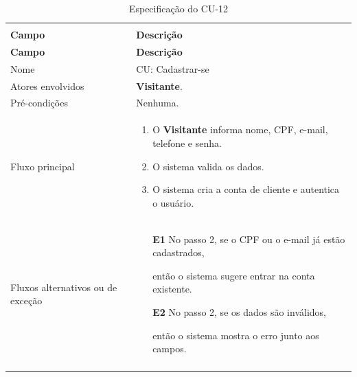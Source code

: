 \documentclass[12pt,a4paper]{article}
\begin{document}
{\setlength{\arrayrulewidth}{0.3pt}\renewcommand{\arraystretch}{1.1}\small{}
\begin{xltabular}{\textwidth}{>{\raggedright\arraybackslash}p{3.4cm}|>{\raggedright\arraybackslash}X}
\caption{Especificação do CU-12}\\
\toprule{}
\textbf{Campo} & \textbf{Descrição}\\ \midrule{}
\endfirsthead
{}\toprule{}
\textbf{Campo} & \textbf{Descrição}\\ \midrule{}
\endhead
\endlastfoot
Nome & CU: Cadastrar-se\\ \hline
Atores envolvidos & \textbf{Visitante}.\\ \hline
Pré-condições & Nenhuma.\\ \hline
Fluxo principal & \begin{enumerate}[nosep,leftmargin=1.4em,label=\arabic*.,before=\vspace{-\baselineskip},after=\vspace{-0.4\baselineskip}]\item O \textbf{Visitante} informa nome, CPF, e-mail, telefone e senha. \item O sistema valida os dados. \item O sistema cria a conta de cliente e autentica o usuário. \end{enumerate}\\ \hline
Fluxos alternativos ou de exceção & \begin{itemize}[nosep,leftmargin=2.2em,labelwidth=2.2em,labelsep=0pt,align=left,itemsep=4pt,before=\vspace{-\baselineskip},after=\vspace{-0.4\baselineskip}]\item[\textbf{E1}] No passo 2, se o CPF ou o e-mail já estão cadastrados,\par então o sistema sugere entrar na conta existente. \item[\textbf{E2}] No passo 2, se os dados são inválidos,\par então o sistema mostra o erro junto aos campos.\end{itemize}\\ \bottomrule
\end{xltabular}}
\end{document}
